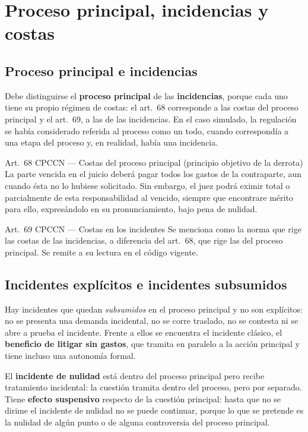 \documentclass[12pt,oneside]{book}
\begin{document}
\section{Proceso principal, incidencias y costas}

\subsection{Proceso principal e incidencias}

Debe distinguirse el \textbf{proceso principal} de las \textbf{incidencias}, porque cada uno tiene su propio r\'egimen de costas: el art.~68 corresponde a las costas del proceso principal y el art.~69, a las de las incidencias. En el caso simulado, la regulaci\'on se hab\'ia considerado referida al proceso como un todo, cuando correspond\'ia a una etapa del proceso y, en realidad, hab\'ia una incidencia.

\begin{norma}{Art.~68 CPCCN --- Costas del proceso principal (principio objetivo de la derrota)}
La parte vencida en el juicio deber\'a pagar todos los gastos de la contraparte, aun cuando \'esta no lo hubiese solicitado. Sin embargo, el juez podr\'a eximir total o parcialmente de esta responsabilidad al vencido, siempre que encontrare m\'erito para ello, expres\'andolo en su pronunciamiento, bajo pena de nulidad.
\end{norma}

\begin{norma}{Art.~69 CPCCN --- Costas en los incidentes}
Se menciona como la norma que rige las costas de las incidencias, a diferencia del art.~68, que rige las del proceso principal. Se remite a su lectura en el c\'odigo vigente.
\end{norma}

\subsection{Incidentes expl\'icitos e incidentes subsumidos}

Hay incidentes que quedan \emph{subsumidos} en el proceso principal y no son expl\'icitos: no se presenta una demanda incidental, no se corre traslado, no se contesta ni se abre a prueba el incidente. Frente a ellos se encuentra el incidente cl\'asico, el \textbf{beneficio de litigar sin gastos}, que tramita en paralelo a la acci\'on principal y tiene incluso una autonom\'ia formal.

El \textbf{incidente de nulidad} est\'a dentro del proceso principal pero recibe tratamiento incidental: la cuesti\'on tramita dentro del proceso, pero por separado. Tiene \textbf{efecto suspensivo} respecto de la cuesti\'on principal: hasta que no se dirime el incidente de nulidad no se puede continuar, porque lo que se pretende es la nulidad de alg\'un punto o de alguna controversia del proceso principal.
\end{document}
